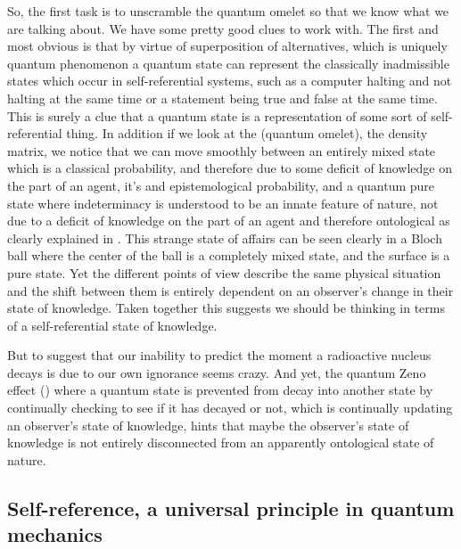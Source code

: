 So, the first task is to unscramble the quantum omelet so that we know what we are talking about. We have some pretty good clues to work with. The first and most obvious is that by virtue of superposition of alternatives, which is uniquely quantum phenomenon a quantum state can represent the classically inadmissible states which occur in self-referential systems, such as a computer halting and not halting at the same time \autocite{szangolies_2020} or a statement being true and false at the same time. This is surely a clue that a quantum state is a representation of some sort of self-referential thing. In addition if we look at the \textquote(quantum omelet), the density matrix,  we notice that we can move smoothly between an entirely mixed state which is a classical probability, and therefore due to some deficit of knowledge on the part of an agent, it's and epistemological probability, and a quantum pure state where indeterminacy is understood to be an innate feature of nature, not due to a deficit of knowledge on the part of an agent and therefore ontological as clearly explained in \autocite{bruknerzeilinger2001shannon}. This strange state of affairs can be seen clearly in a Bloch ball where the center of the ball is a completely mixed state, and the surface is a pure state. Yet the different points of view describe the same physical situation and the shift between them is entirely dependent on an observer's change in their state of knowledge. Taken together this suggests we should be thinking in terms of a self-referential state of knowledge.

But to suggest that our inability to predict the moment a radioactive nucleus decays is due to our own ignorance seems crazy. And yet, the quantum Zeno effect (\autocite{georgesu_2022, saverio_2013, Misra1977TheTheory}) where a quantum state is prevented from decay into another state by continually checking to see if it has decayed or not, which is continually updating an observer's state of knowledge, hints that maybe the observer's state of knowledge is not entirely disconnected from an apparently ontological state of nature.


\subsection{Self-reference, a universal principle in quantum mechanics}

